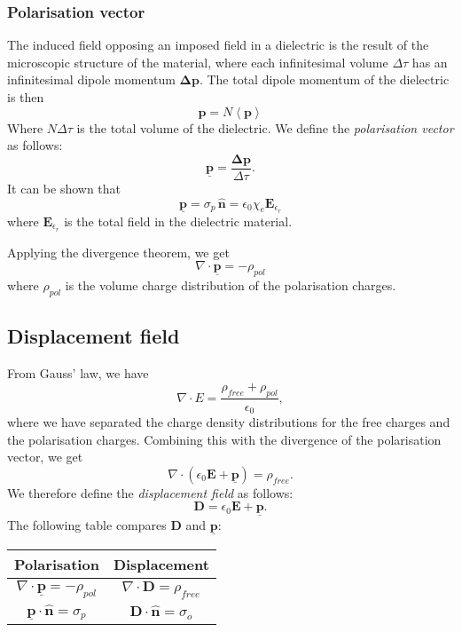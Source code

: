 \documentclass[a4paper, 12pt]{article}
\renewcommand{\vec}[1]{\mathbf{#1}}
\newcommand{\E}{\ensuremath{\vec{E}}}
\newcommand{\e}{\ensuremath{\epsilon_0}}
\newcommand{\p}{\ensuremath{\vec{\underline{p}}}}
\newcommand{\D}{\ensuremath{\vec{D}}}
\let\tmp\hat
\renewcommand{\hat}[1]{\vec{\tmp{#1}}}
\begin{document}
    \subsubsection{Polarisation vector}
        The induced field opposing an imposed field in a dielectric is the result of the microscopic structure of the material, 
        where each infinitesimal volume $\Delta \tau$ has an infinitesimal dipole momentum $\vec{\Delta p}$. 
        The total dipole momentum of the dielectric is then 
        \begin{equation}
            \vec{p} = N\left< \vec{p} \right>
        \end{equation}
        Where $N\Delta \tau$ is the total volume of the dielectric. We define the \textit{polarisation vector} as follows:
        \begin{equation}
            \p = \frac{\vec{\Delta p}}{\Delta \tau}.
        \end{equation}
        It can be shown that 
        \begin{equation}
            \p = \sigma_p\,\hat{n} = \e \chi_e \E_{\epsilon_r}
        \end{equation}
        where $\E_{\epsilon_r}$ is the total field in the dielectric material.
        
        Applying the divergence theorem, we get
        \begin{equation}
            \nabla \cdot \p = - \rho_{pol}
        \end{equation}
        where $\rho_{pol}$ is the volume charge distribution of the polarisation charges.

\subsection{Displacement field}
    From Gauss' law, we have 
    \begin{equation*}
        \nabla \cdot E = \frac{\rho_{free} + \rho_{pol}}{\e},
    \end{equation*}
    where we have separated the charge density distributions for the free charges and the polarisation charges. 
    Combining this with the divergence of the polarisation vector, we get 
    \begin{equation*}
        \nabla \cdot \left(\e\E + \p\right) = \rho_{free}.
    \end{equation*}
    We therefore define the \textit{displacement field} as follows:
    \begin{equation}
        \D = \e\E + \p.
    \end{equation}
    The following table compares $\D$ and $\p$:
    \begin{center}
        \begin{tabular}{ c|c } 
        Polarisation & Displacement \\
        \hline
         $\nabla \cdot \p = -\rho_{pol}$ & $\nabla \cdot \D = \rho_{free}$ \\
         $\p \cdot \hat{n} = \sigma_p$ & $\D \cdot \hat{n} = \sigma_o$
        \end{tabular}
    \end{center}
\end{document}
